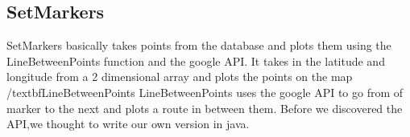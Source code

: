 \documentclass{project}
\begin{document}
\subsection{SetMarkers}
SetMarkers basically takes points from the database and plots them using the LineBetweenPoints function and the google API. It takes in the latitude and longitude from a 2 dimensional array and plots the points on the map
/textbf{LineBetweenPoints}
LineBetweenPoints uses the google API to go from of marker to the next and plots a route in between them. Before we discovered the API,we thought to write our own version in java. 

\end{document}
